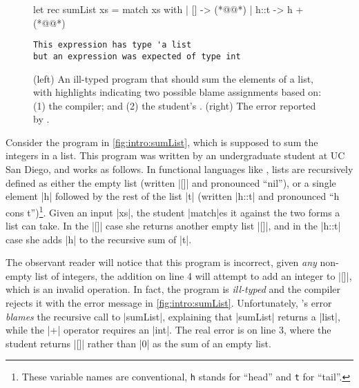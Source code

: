 \begin{figure}[t]
\small
\begin{minipage}{0.45\linewidth}
\begin{ecode}
let rec sumList xs =
  match xs with
  | []   -> (*@\hlSherrloc{[]}@*)
  | h::t -> h + (*@@*)
\end{ecode}
\end{minipage}
\begin{minipage}{0.5\linewidth}
\begin{verbatim}
This expression has type 'a list
but an expression was expected of type int
\end{verbatim}
\end{minipage}
\caption{(left) An ill-typed \ocaml program that should sum the elements of a
  list, with highlights indicating two possible blame assignments based on:
  (1) the \hlTree{\ocaml} compiler; and
  (2) the student's .
  (right) The error reported by \ocaml.}
\label{fig:intro:sumList}
\end{figure}

Consider the \ocaml program in \autoref{fig:intro:sumList}, which is
supposed to sum the integers in a list.
%
This program was written by an undergraduate student at UC San Diego,
and works as follows.
%
In functional languages like \ocaml, lists are recursively defined as
either the empty list (written |[]| and pronounced ``nil''), or a single
element |h| followed by the rest of the list |t| (written |h::t| and
pronounced ``h cons t'')\footnote{These variable names are conventional,
  \texttt{h} stands for ``head'' and \texttt{t} for ``tail''.}.
%
Given an input |xs|, the student |match|es it against the
two forms a list can take.
%
In the |[]| case she returns another empty list |[]|, and in the
|h::t| case she adds |h| to the recursive sum of |t|.

The observant reader will notice that this program is incorrect, given
\emph{any} non-empty list of integers, the addition on line 4 will
attempt to add an integer to |[]|, which is an invalid operation.
%
In fact, the program is \emph{ill-typed} and the \ocaml compiler rejects
it with the error message in \autoref{fig:intro:sumList}.
%
Unfortunately, \ocaml's error \emph{blames} the recursive call to
|sumList|, explaining that |sumList| returns a |list|, while the |+|
operator requires an |int|.
%
The real error is on line 3, where the student returns |[]| rather than
|0| as the sum of an empty list.

